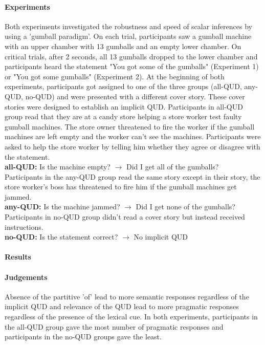 \documentclass[12pt]{article}
\begin{document}
\paragraph{Experiments} Both experiments investigated the robustness and speed of scalar inferences by using a 'gumball paradigm'. On each trial, participants saw a gumball machine with an upper chamber with 13 gumballs and an empty lower chamber. On critical trials, after 2 seconds, all 13 gumballs dropped to the lower chamber and participants heard the statement "You got some of the gumballs" (Experiment 1) or "You got some gumballs" (Experiment 2). At the beginning of both experiments, participants got assigned to one of the three groups (all-QUD, any-QUD, no-QUD) and were presented with a different cover story. These cover stories were designed to establish an implicit QUD. Participants in all-QUD group read that they are at a candy store helping a store worker test faulty gumball machines. The store owner threatened to fire the worker if the gumball machines are left empty and the worker can't see the machines. Participants were asked to help the store worker by telling him whether they agree or disagree with the statement.\\
\indent\textbf{all-QUD:} Is the machine empty? $\rightarrow$ Did I get all of the gumballs?\\
Participants in the any-QUD group read the same story except in their story, the store worker’s boss has threatened to fire him if the gumball machines get jammed.\\
\indent\textbf{any-QUD:} Is the machine jammed? $\rightarrow$ Did I get none of the gumballs?\\
Participants in no-QUD group didn't read a cover story but instead received instructions.\\
\indent\textbf{no-QUD:} Is the statement correct? $\rightarrow$ No implicit QUD 


\paragraph{Results} 
\paragraph{Judgements}
Absence of the partitive ’of’ lead to more semantic responses regardless of the implicit QUD and relevance of the QUD lead to more pragmatic responses regardless of the presence of the lexical cue. In both experiments, participants in the all-QUD group gave the most number of pragmatic responses and participants in the no-QUD groups gave the least.
\end{document}
